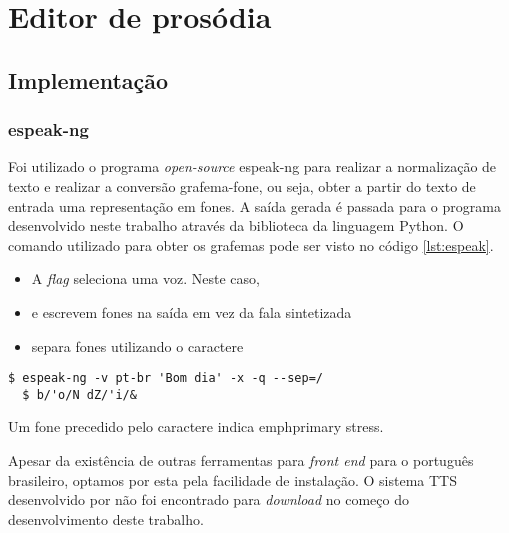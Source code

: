 
\simb[ms (milissegundos)]
\simb[Hz (Hertz)]
\chapter{Editor de prosódia}

\section{Implementação}

\subsection{espeak-ng}
Foi utilizado o programa \emph{open-source} espeak-ng \cite{espeakng} para
realizar a normalização de texto e realizar a conversão grafema-fone, ou seja,
obter a partir do texto de entrada uma representação em fones. A saída gerada
é passada para o programa desenvolvido neste trabalho através da biblioteca
 da linguagem Python. O comando utilizado para obter os grafemas pode ser visto no código \ref{lst:espeak}.

\begin{itemize}
\item A \emph{flag}  seleciona uma voz. Neste caso, 
\item {} e  escrevem fones na saída em vez da fala sintetizada
\item {} separa fones utilizando o caractere \code{/}
\end{itemize}

\begin{lstlisting}[caption=Utilização do programa espeak e saída correspondente,
  label=lst:espeak]
  $ espeak-ng -v pt-br 'Bom dia' -x -q --sep=/
  $ b/'o/N dZ/'i/&
\end{lstlisting}

Um fone precedido pelo caractere \code{\'} indica emph{primary stress}.

Apesar da existência de outras ferramentas para \emph{front end} para o
português brasileiro, optamos por esta pela facilidade de instalação. O sistema
TTS desenvolvido por  não foi encontrado para \emph{download}
no começo do desenvolvimento deste trabalho.

